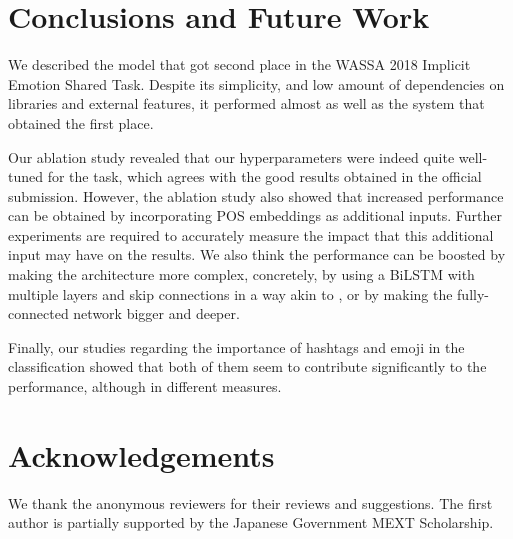\documentclass[11pt,a4paper]{article}
\begin{document}
\section{Conclusions and Future Work}

We described the model that got second place in the WASSA 2018 Implicit Emotion
Shared Task. Despite its simplicity, and low amount of dependencies on libraries
and external features, it performed almost as well as the system that obtained
the first place.

Our ablation study revealed that our hyperparameters were indeed quite
well-tuned for the task, which agrees with the good results obtained in the
official submission. However, the ablation study also showed that increased
performance can be obtained by incorporating POS embeddings as additional
inputs. Further experiments are required to accurately measure the impact that
this additional input may have on the results. We also think the performance can
be boosted by making the architecture more complex, concretely, by using a
BiLSTM with multiple layers and skip connections in a way akin to
\cite{peters2018deep}, or by making the fully-connected network bigger and
deeper.

Finally, our studies regarding the importance of hashtags and emoji in the
classification showed that both of them seem to contribute significantly to the
performance, although in different measures. 

\section{Acknowledgements}%
\label{sec:acknowledgements}

We thank the anonymous reviewers for their reviews and suggestions. The first
author is partially supported by the Japanese Government MEXT Scholarship.



\end{document}
